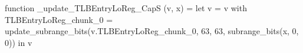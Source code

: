 function _update_TLBEntryLoReg_CapS (v, x) = let v = { v with TLBEntryLoReg_chunk_0 = update_subrange_bits(v.TLBEntryLoReg_chunk_0, 63, 63, subrange_bits(x, 0, 0)) } in
  v
